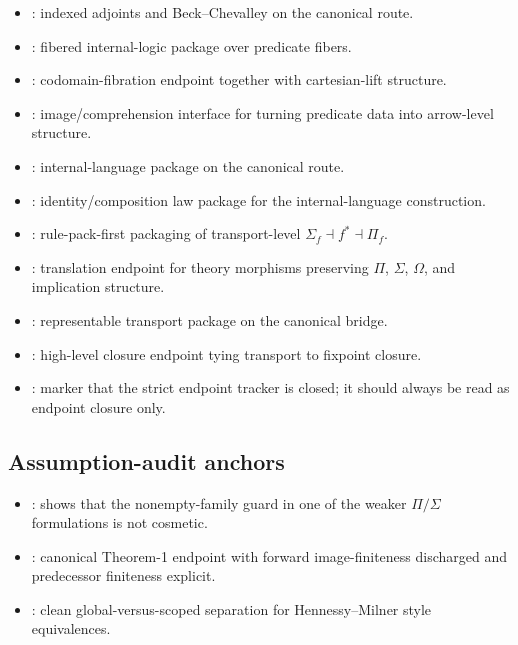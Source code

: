 \documentclass[11pt]{article}
\begin{document}
\begin{itemize}
  \item {}: indexed adjoints and Beck--Chevalley on the canonical route.
  \item {}: fibered internal-logic package over predicate fibers.
  \item {}: codomain-fibration endpoint together with cartesian-lift structure.
  \item {}: image/comprehension interface for turning predicate data into arrow-level structure.
  \item {}: internal-language package on the canonical route.
  \item {}: identity/composition law package for the internal-language construction.
  \item {}: rule-pack-first packaging of transport-level $\Sigma_f \dashv f^* \dashv \Pi_f$.
  \item {}: translation endpoint for theory morphisms preserving $\Pi$, $\Sigma$, $\Omega$, and implication structure.
  \item {}: representable transport package on the canonical bridge.
  \item {}: high-level closure endpoint tying transport to fixpoint closure.
  \item {}: marker that the strict endpoint tracker is closed; it should always be read as endpoint closure only.
\end{itemize}

\subsection{Assumption-audit anchors}

\begin{itemize}
  \item {}: shows that the nonempty-family guard in one of the weaker $\Pi/\Sigma$ formulations is not cosmetic.
  \item {}: canonical Theorem-1 endpoint with forward image-finiteness discharged and predecessor finiteness explicit.
  \item {}: clean global-versus-scoped separation for Hennessy--Milner style equivalences.
\end{itemize}
\end{document}
